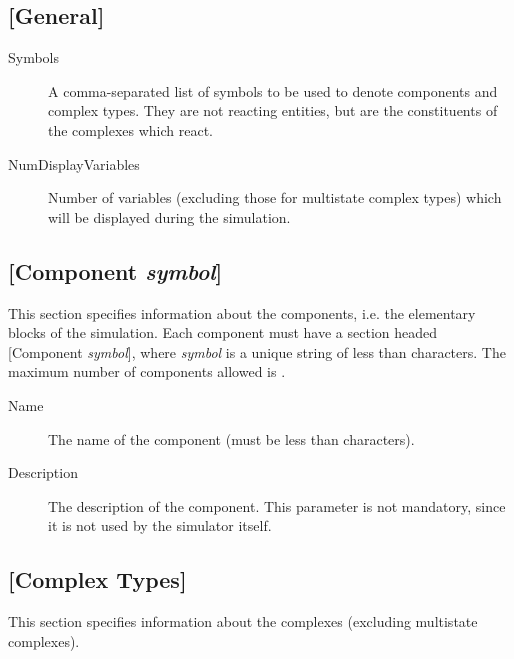 \subsection{[General]}
\begin{description}
\item[Symbols] A comma-separated list of symbols to be used to denote
components and complex types.  They are not reacting entities, but are the
constituents of the complexes which react.
       
\item[NumDisplayVariables] Number of variables (excluding those for
  multistate complex types) which will be displayed during the
  simulation.
\end{description}

\subsection{[Component \emph{symbol}]}
This section specifies information about the components, i.e. the
elementary blocks of the simulation. Each component must have a
section headed [Component \emph{symbol}], where \emph{symbol} is a
unique string of less than \MAXCOMPONENTSYMBOLLENGTH{} characters. The
maximum number of components allowed is \MAXCOMPONENTS{}.

\begin{description}
\item[Name] The name of the component (must be less than
\MAXCOMPONENTNAMELENGTH{} characters).

\item[Description] The description of the component.  This parameter
is not mandatory, since it is not used by the \stochsim{} simulator
itself.
\end{description}

\subsection{[Complex Types]}
This section specifies information about the complexes (excluding
multistate complexes).

